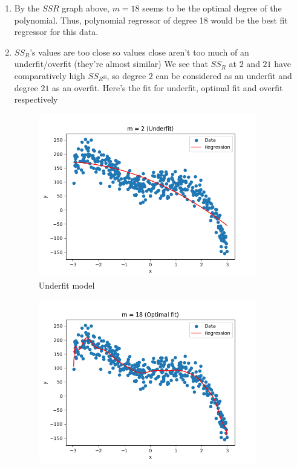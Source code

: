 \begin{enumerate}
	\item By the $SSR$ graph above, $m=18$ seems to be the optimal degree of
	      the polynomial. Thus, polynomial regressor of degree 18 would be the
	      best fit regressor for this data.
	\item $SS_R$'s values are too close so values close aren't too much of an
	      underfit/overfit (they're almost similar) We see that $SS_R$ at $2$
	      and $21$ have comparatively high $SS_R$s, so degree $2$ can be
	      considered as an underfit and degree $21$ as an overfit. Here's the
	      fit for underfit, optimal fit and overfit respectively
	      \begin{figure}
		      \centering
		      \includegraphics[width=0.9\textwidth]{../images/3/3_underfit.png}
		      \caption{Underfit model}
	      \end{figure}
	      \begin{figure}
		      \centering
		      \includegraphics[width=0.9\textwidth]{../images/3/3_correctfit.png}

\end{figure}
\end{enumerate}
